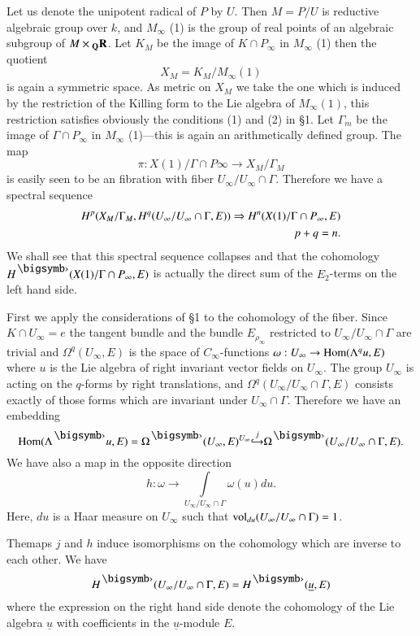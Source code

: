 Let us denote the unipotent radical of $P$ by $U$. Then $M = P/U$ is reductive algebraic group over $k$, and $M_\infty$ (1) is the group of real points of an algebraic subgroup of $M \times {}_{\mathbf{Q}} \mathbf{R}$. Let $K_M$ be the image of $K \cap P_\infty$ in $M_\infty$ (1) then the quotient
$$
X_M = K_M / M_\infty (1)
$$
is again a symmetric space. As metric on $X_M$ we take the one which is induced by the restriction of the Killing form to the Lie algebra of $M_\infty(1)$, this restriction satisfies obviously the conditions (1) and (2) in \S 1. Let $\Gamma_m$ be the image of $\Gamma \cap P_\infty$ in $M_\infty$ (1)---this is again an arithmetically defined group. The map
$$
\pi : X (1) / \Gamma \cap P\infty \to X_M / \Gamma_M
$$
is easily seen to be an fibration with fiber $U_\infty/ U_\infty \cap \Gamma$. Therefore we have a spectral sequence
\setcounter{equation}{0}
\begin{align}
H^p (X_M / \Gamma_M, H^q(U_\infty/ U_\infty \cap \Gamma, E)) \Rightarrow H^n (X (1)/ \Gamma \cap P_\infty, E) &\label{art5-eq2.1}\\
p+q = n.&\notag
\end{align}
We shall see that this spectral sequence collapses and that the cohomology $H^\bigdot (X (1)/ \Gamma \cap P_\infty, E)$ is actually the direct sum of the $E_2$-terms on the left hand side.

First we apply the considerations of \S 1 to the cohomology of the fiber. Since $K \cap U_\infty = e$ the tangent bundle and the bundle $E_{\rho_\infty}$ restricted to $U_\infty/ U_\infty \cap \Gamma$ are trivial and $\Omega^q (U_\infty, E)$ is the space of $C_\infty$-functions $\omega : U_\infty \to \operatorname{Hom} (\Lambda^q u, E)$ where $u$ is the Lie algebra of right invariant vector fields on $U_\infty$. The group $U_\infty$ is acting on the $q$-forms by right translations, and $\Omega^q (U_\infty/ U_\infty \cap \Gamma, E)$ consists exactly of those forms which are invariant under $U_\infty \cap \Gamma$. Therefore we have an embedding
$$
\Hom (\Lambda^\bigdot u, E) = \Omega^\bigdot (U_\infty, E)^{U_\infty} {\displaystyle{\mathop{\hookrightarrow}^j}} \Omega^\bigdot (U_\infty/ U_\infty \cap \Gamma, E).
$$
We have also a map in the opposite direction
$$
h : \omega \to \int\limits_{U_\infty/ U_\infty \cap \Gamma} \omega (u) du.
$$
Here, $du$ is a Haar measure on $U_\infty$ such that $\operatorname{vol}_{du} (U_\infty / U_\infty \cap \Gamma) = 1$.

\setcounter{theorem}{1}
\begin{theorem}\label{art5-thm2.2}
The\pageoriginale maps $j$ and $h$ induce isomorphisms on the cohomology which are inverse to each other. We have
$$
H^\bigdot (U_\infty/ U_\infty \cap \Gamma, E) = H^\bigdot (\underline{u}, E)
$$
where the expression on the right hand side denote the cohomology of the Lie algebra $\underline{u}$ with coefficients in the $\underline{u}$-module $E$.
\end{theorem}

